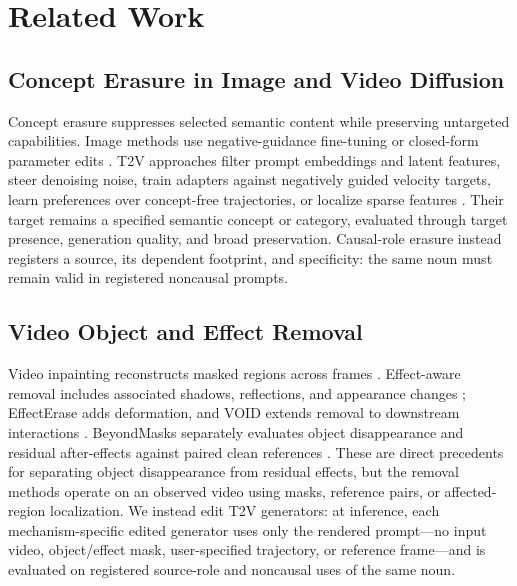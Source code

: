 \section{Related Work}
\label{sec:related-work}

\subsection{Concept Erasure in Image and Video Diffusion}
\label{subsec:related-concept-erasure}

Concept erasure suppresses selected semantic content while preserving
untargeted capabilities.  Image methods use negative-guidance fine-tuning or
closed-form parameter edits \citep{gandikota2023esd,gandikota2024uce}.  T2V
approaches filter prompt embeddings and latent features, steer denoising
noise, train adapters against negatively guided velocity targets, learn
preferences over concept-free trajectories, or localize sparse features
\citep{yoon2025safree,xu2025videoeraser,ye2025t2vunlearning,wang2026latentdpo,wang2026erasesae}.
Their target remains a specified semantic concept or category, evaluated
through target presence, generation quality, and broad preservation.  Causal-role erasure
instead registers a source, its dependent footprint, and specificity: the
same noun must remain valid in registered noncausal prompts.

\subsection{Video Object and Effect Removal}
\label{subsec:related-video-editing}

Video inpainting reconstructs masked regions across frames
\citep{zhou2023propainter}.  Effect-aware removal includes associated shadows,
reflections, and appearance changes \citep{miao2025rose,kushwaha2026objectwiper};
EffectErase adds deformation, and VOID extends removal to downstream
interactions \citep{fu2026effecterase,motamed2026void}.  BeyondMasks separately
evaluates object disappearance and residual after-effects against paired clean
references \citep{ekin2026beyondmasks}.  These are direct precedents for
separating object disappearance from residual effects, but the removal
methods operate on an observed video using masks, reference pairs,
or affected-region localization.  We instead edit T2V generators: at
inference, each mechanism-specific edited generator uses only the rendered prompt---no
input video, object/effect mask, user-specified trajectory, or reference
frame---and is evaluated on registered source-role and noncausal uses of the
same noun.

